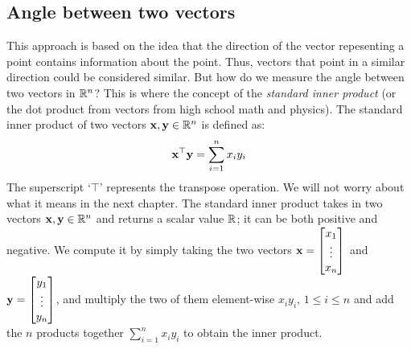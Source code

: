 \subsection{Angle between two vectors}
This approach is based on the idea that the direction of the vector repesenting a point contains information about the point. Thus, vectors that point in a similar direction could be considered similar. But how do we measure the angle between two vectors in $\mathbb{R}^n$? This is where the concept of the \textit{standard inner product} (or the dot product from vectors from high school math and physics). The standard inner product of two vectors $\mathbf{x}, \mathbf{y} \in \mathbb{R}^n$ is defined as:
\[ \mathbf{x}^\top\mathbf{y} = \sum_{i=1}^{n} x_i y_i \]
The superscript `$\top$' represents the transpose operation. We will not worry about what it means in the next chapter. The standard inner product takes in two vectors $\mathbf{x}, \mathbf{y} \in \mathbb{R}^n$ and returns a scalar value $\mathbb{R}$; it can be both positive and negative. We compute it by simply taking the two vectors $\mf{x} = \bmxc x_1 \\ \vdots \\ x_n \emx$ and $\mf{y} = \bmxc y_1 \\ \vdots \\ y_n \emx$, and multiply the two of them element-wise $x_i y_i, \, 1 \leq i \leq n$ and add the $n$ products together $\sum_{i=1}^n x_i y_i$ to obtain the inner product.

